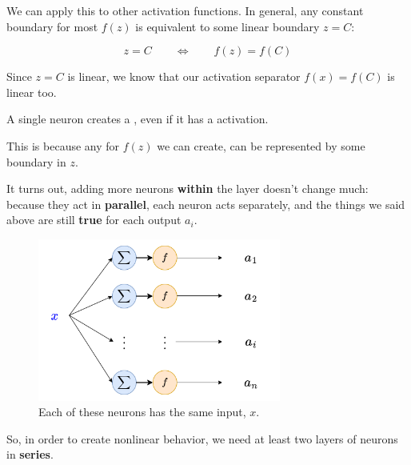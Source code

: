         We can apply this to other activation functions. In general, any constant boundary for most $f(z)$ is equivalent to some linear boundary $z=C$:
        
        \begin{equation}
            z=C 
            \qquad
            \Longleftrightarrow
            \qquad
            f(z)=f(C)
        \end{equation}
        
        Since $z=C$ is linear, we know that our activation separator $f(x)=f(C)$ is linear too.\\
        
        \begin{concept}
            A single neuron creates a , even if it has a  activation.
            
            This is because any  for $f(z)$ we can create, can be represented by some  boundary in $z$.
        \end{concept}
        
        
        It turns out, adding more neurons \textbf{within} the layer doesn't change much: because they act in \textbf{parallel}, each neuron acts separately, and the things we said above are still \textbf{true} for each output $a_i$.
        
        \begin{figure}[H]
            \centering
            \includegraphics[width=80mm,scale=0.4]{images/nn_images/remove_input.png}
            \caption*{Each of these neurons has the same input, $x$.}
        \end{figure}
        
        So, in order to create nonlinear behavior, we need at least two layers of neurons in \textbf{series}.
        
